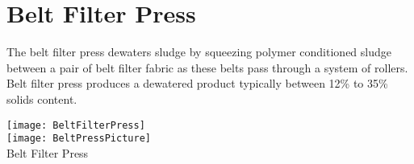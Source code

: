 \section{Belt Filter Press}

The belt filter press dewaters sludge by squeezing polymer conditioned sludge between a pair of belt filter fabric as these belts pass through a system of rollers. Belt filter press produces a dewatered product typically between 12\% to 35\% solids content.


		\begin{center}
		\texttt{[image: BeltFilterPress]}\\
		\vspace{1cm}
		\texttt{[image: BeltPressPicture]}\\
		Belt Filter Press
		\end{center}

